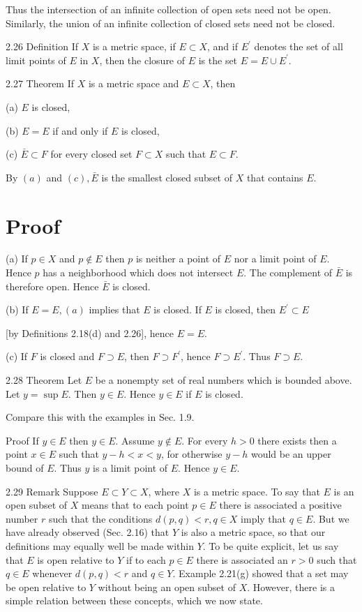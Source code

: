 \documentclass[10pt]{article}
\begin{document}
Thus the intersection of an infinite collection of open sets need not be open. Similarly, the union of an infinite collection of closed sets need not be closed.

2.26 Definition If $X$ is a metric space, if $E \subset X$, and if $E^{\prime}$ denotes the set of all limit points of $E$ in $X$, then the closure of $E$ is the set $E=E \cup E^{\prime}$.

2.27 Theorem If $X$ is a metric space and $E \subset X$, then

(a) $E$ is closed,

(b) $E=E$ if and only if $E$ is closed,

(c) $\bar{E} \subset F$ for every closed set $F \subset X$ such that $E \subset F$.

By $(a)$ and $(c), \bar{E}$ is the smallest closed subset of $X$ that contains $E$.

\section{Proof}
(a) If $p \in X$ and $p \notin E$ then $p$ is neither a point of $E$ nor a limit point of $E$. Hence $p$ has a neighborhood which does not intersect $E$. The complement of $\bar{E}$ is therefore open. Hence $\bar{E}$ is closed.

(b) If $E=E,(a)$ implies that $E$ is closed. If $E$ is closed, then $E^{\prime} \subset E$

[by Definitions 2.18(d) and 2.26], hence $E=E$.

(c) If $F$ is closed and $F \supset E$, then $F \supset F^{\prime}$, hence $F \supset E^{\prime}$. Thus $F \supset E$.

2.28 Theorem Let $E$ be a nonempty set of real numbers which is bounded above. Let $y=\sup E$. Then $y \in E$. Hence $y \in E$ if $E$ is closed.

Compare this with the examples in Sec. 1.9.

Proof If $y \in E$ then $y \in E$. Assume $y \notin E$. For every $h>0$ there exists then a point $x \in E$ such that $y-h<x<y$, for otherwise $y-h$ would be an upper bound of $E$. Thus $y$ is a limit point of $E$. Hence $y \in E$.

2.29 Remark Suppose $E \subset Y \subset X$, where $X$ is a metric space. To say that $E$ is an open subset of $X$ means that to each point $p \in E$ there is associated a positive number $r$ such that the conditions $d(p, q)<r, q \in X$ imply that $q \in E$. But we have already observed (Sec. 2.16) that $Y$ is also a metric space, so that our definitions may equally well be made within $Y$. To be quite explicit, let us say that $E$ is open relative to $Y$ if to each $p \in E$ there is associated an $r>0$ such that $q \in E$ whenever $d(p, q)<r$ and $q \in Y$. Example 2.21(g) showed that a set
may be open relative to $Y$ without being an open subset of $X$. However, there is a simple relation between these concepts, which we now state.
\end{document}
